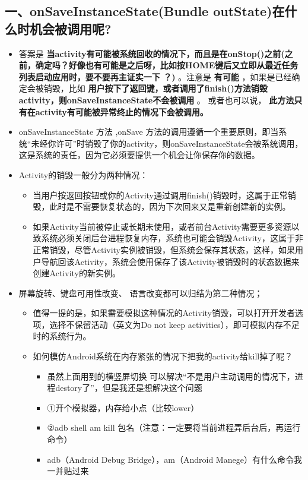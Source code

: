 \documentclass[9pt, b5paper]{article}
\begin{document}
\subsection{一、onSaveInstanceState(Bundle outState)在什么时机会被调用呢?}
\label{sec-11-1}
\begin{itemize}
\item 答案是 \textbf{当activity有可能被系统回收的情况下，而且是在onStop()之前(之前，确定吗？好像也有可能是之后呀，比如按HOME键后又立即从最近任务列表启动应用时，要不要再主证实一下 ？)} 。注意是 \textbf{有可能} ，如果是已经确定会被销毁，比如 \textbf{用户按下了返回键，或者调用了finish()方法销毁activity，则onSaveInstanceState不会被调用} 。 或者也可以说， \textbf{此方法只有在activity有可能被异常终止的情况下会被调用。}
\item onSaveInstanceState 方法 ,onSave 方法的调用遵循一个重要原则，即当系统“未经你许可”时销毁了你的activity，则onSaveInstanceState会被系统调用，这是系统的责任，因为它必须要提供一个机会让你保存你的数据。
\item Activity的销毁一般分为两种情况：
\begin{itemize}
\item 当用户按返回按钮或你的Activity通过调用finish()销毁时，这属于正常销毁，此时是不需要恢复状态的，因为下次回来又是重新创建新的实例。
\item 如果Activity当前被停止或长期未使用，或者前台Activity需要更多资源以致系统必须关闭后台进程恢复内存，系统也可能会销毁Activity，这属于非正常销毁，尽管Activity实例被销毁，但系统会保存其状态，这样，如果用户导航回该Activity，系统会使用保存了该Activity被销毁时的状态数据来创建Activity的新实例。
\end{itemize}
\item 屏幕旋转、键盘可用性改变、 语言改变都可以归结为第二种情况；
\begin{itemize}
\item 值得一提的是，如果需要模拟这种情况的Activity销毁，可以打开开发者选项，选择不保留活动（英文为Do not keep activities），即可模拟内存不足时的系统行为。
\item 如何模仿Android系统在内存紧张的情况下把我的activity给kill掉了呢？
\begin{itemize}
\item 虽然上面用到的横竖屏切换 可以解决“不是用户主动调用的情况下，进程destory了”，但是我还是想解决这个问题
\item ①开个模拟器，内存给小点（比较lower）
\item ②adb shell am kill 包名（注意：一定要将当前进程弄后台后，再运行命令）
\item adb（Android Debug Bridge），am（Android Manege）有什么命令我一并贴过来

\end{itemize}
\end{itemize}
\end{itemize}
\end{document}

